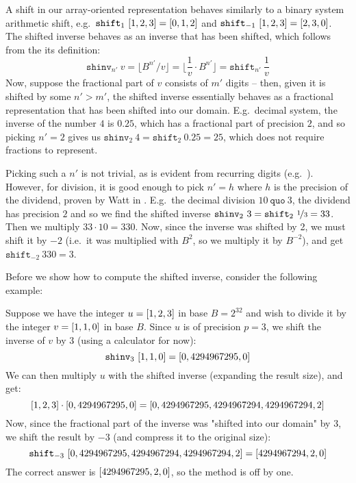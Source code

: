 A shift in our array-oriented representation behaves similarly to a binary
system arithmetic shift, e.g.\ $\mathtt{shift}_1~\mathtt{[}1,2,3\mathtt{]} = \mathtt{[}0,1,2\mathtt{]}$ and
$\mathtt{shift}_{-1}~\mathtt{[}1,2,3\mathtt{]} = \mathtt{[}2,3,0\mathtt{]}$. The shifted inverse behaves as
an inverse that has been shifted, which follows from the its definition:
\begin{equation}
\label{eq:shiftinvex}
\mathtt{shinv}_{n'}~v = \lfloor B^{n'}/ v \rfloor = \lfloor \dfrac{1}{v} \cdot B^{n'} \rfloor = \mathtt{shift}_{n'}~\dfrac{1}{v}
\end{equation}
Now, suppose the fractional part of $v$ consists of $m'$ digits -- then, given it
is shifted by some $n'>m'$, the shifted inverse essentially behaves as a
fractional representation that has been shifted into our domain. E.g.\ decimal
system, the inverse of the number $4$ is $0.25$, which has a fractional part of
precision $2$, and so picking $n'=2$ gives us
$\mathtt{shinv}_2~4 = \mathtt{shift}_2~0.25 = 25$, which does not require
fractions to represent.

Picking such a $n'$ is not trivial, as is evident from recurring digits (e.g.\
). However, for division, it is good enough to pick $n'=h$ where
$h$ is the precision of the dividend, proven by Watt in
\cite{watt2023efficient}. E.g.\ the decimal division $10~ \mathtt{quo}~3$, the
dividend has precision $2$ and so we find the shifted inverse
$\mathtt{shinv}_2~3= \mathtt{shift}_2~\nicefrac{1}{3} = 33$. Then we multiply
$33\cdot10 = 330$. Now, since the inverse was shifted by 2, we must shift it by
$-2$ (i.e.\ it was multiplied with $B^2$, so we multiply it by $B^{-2}$), and
get $\mathtt{shift}_{-2}~330 = 3$.

Before we show how to compute the shifted inverse, consider the following
example:

\begin{example}
  Suppose we have the integer $u=\mathtt{[}1,2,3\mathtt{]}$ in base $B=2^{32}$ and wish to
  divide it by the integer $v=\mathtt{[}1,1,0\mathtt{]}$ in base $B$. Since $u$ is of
  precision $p=3$, we shift the inverse of $v$ by $3$ (using a calculator for
  now):
\begin{equation}
\label{eq:3}
\mathtt{shinv}_3~\mathtt{[}1,1,0\mathtt{]} = \mathtt{[}0,4294967295,0\mathtt{]}
\end{equation}
We can then multiply $u$ with the shifted inverse (expanding the result size),
and get:
\begin{equation}
  \label{eq:4}
  \mathtt{[}1,2,3\mathtt{]}\cdot\mathtt{[}0,4294967295,0\mathtt{]} = \mathtt{[}0,4294967295,4294967294,4294967294,2\mathtt{]}
\end{equation}
Now, since the fractional part of the inverse was "shifted into our domain" by
3, we shift the result by $-3$ (and compress it to the original size):
\begin{equation}
  \label{eq:5}
  \mathtt{shift}_{-3}~\mathtt{[}0,4294967295,4294967294,4294967294,2\mathtt{]} = \mathtt{[}4294967294,2,0\mathtt{]}
\end{equation}
The correct answer is $\mathtt{[}4294967295,2,0\mathtt{]}$, so the method is off by one.
\end{example}\bigskip

